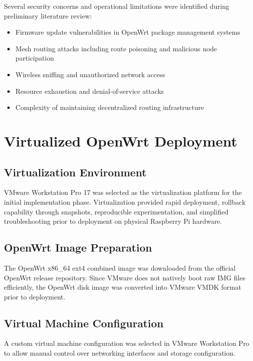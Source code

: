 \documentclass[conference]{IEEEtran}
\begin{document}
Several security concerns and operational limitations were identified during preliminary literature review:

\begin{itemize}
    \item Firmware update vulnerabilities in OpenWrt package management systems
    \item Mesh routing attacks including route poisoning and malicious node participation
    \item Wireless sniffing and unauthorized network access
    \item Resource exhaustion and denial-of-service attacks
    \item Complexity of maintaining decentralized routing infrastructure
\end{itemize}

\section{Virtualized OpenWrt Deployment}

\subsection{Virtualization Environment}

VMware Workstation Pro 17 was selected as the virtualization platform for the initial implementation phase. Virtualization provided rapid deployment, rollback capability through snapshots, reproducible experimentation, and simplified troubleshooting prior to deployment on physical Raspberry Pi hardware.

\subsection{OpenWrt Image Preparation}

The OpenWrt x86\_64 ext4 combined image was downloaded from the official OpenWrt release repository. Since VMware does not natively boot raw IMG files efficiently, the OpenWrt disk image was converted into VMware VMDK format prior to deployment.

\subsection{Virtual Machine Configuration}

A custom virtual machine configuration was selected in VMware Workstation Pro to allow manual control over networking interfaces and storage configuration.
\end{document}
